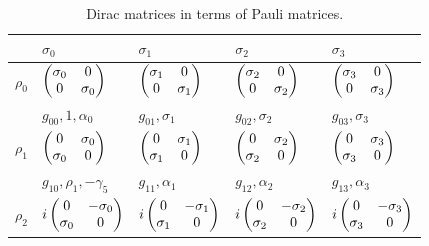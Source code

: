 \documentclass[handout,10pt]{beamer}
\begin{document}
\begin{frame}[shrink=20]{}

\begin{table}[]
\centering
\caption{Dirac matrices in terms of Pauli matrices. }
\label{Dirac_Matrices_Pauli}
\begin{tabular}{l l  l  l  l }
\hline
& $\sigma_0$ & $\sigma_1$  & $\sigma_2$ & $\sigma_3$ \\
\hline
$\rho_0$ 
& $\begin{pmatrix}\sigma_0 & 0\cr 0 & \sigma_0\end{pmatrix}$  
& $\begin{pmatrix}\sigma_1 & 0\cr 0 & \sigma_1\end{pmatrix}$ 
& $\begin{pmatrix}\sigma_2 & 0\cr 0 & \sigma_2\end{pmatrix}$ 
& $\begin{pmatrix}\sigma_3 & 0\cr 0 & \sigma_3\end{pmatrix}$ 
\\
 & $g_{00}, 1, \alpha_0$ & $g_{01}, \sigma_1$  & $g_{02}, \sigma_2$ & $g_{03}, \sigma_3$ \\
\hline
$\rho_1$ 
&  $\begin{pmatrix} 0 & \sigma_0\cr \sigma_0 & 0\end{pmatrix}$ 
&  $\begin{pmatrix} 0 & \sigma_1\cr \sigma_1 & 0\end{pmatrix}$ 
&  $\begin{pmatrix} 0 & \sigma_2\cr \sigma_2 & 0\end{pmatrix}$ 
&  $\begin{pmatrix} 0 & \sigma_3\cr \sigma_3 & 0\end{pmatrix}$ 
 \\
& $g_{10}, \rho_1, -\gamma_5$  & $g_{11}, \alpha_1$  & $g_{12}, \alpha_2$ & $g_{13}, \alpha_3$ \\
\hline
$\rho_2$ 
&  $i \begin{pmatrix} 0 &- \sigma_0\cr \sigma_0 & 0\end{pmatrix}$ 
&  $i \begin{pmatrix} 0 & -\sigma_1\cr \sigma_1 & 0\end{pmatrix}$ 
&  $i \begin{pmatrix} 0 &- \sigma_2\cr \sigma_2 & 0\end{pmatrix}$ 
&  $i \begin{pmatrix} 0 &- \sigma_3\cr \sigma_3 & 0\end{pmatrix}$ 

\end{tabular}
\end{table}
\end{frame}
\end{document}
